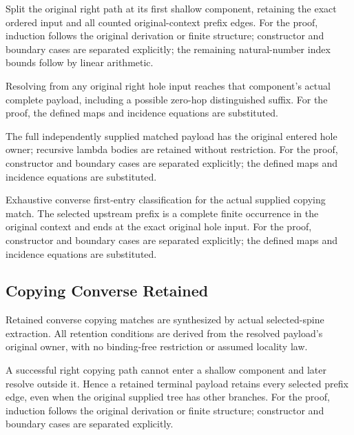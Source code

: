 Split the original right path at its first shallow component, retaining the exact ordered input and all counted original-context prefix edges.
For the proof, induction follows the original derivation or finite structure; constructor and boundary cases are separated explicitly; the remaining natural-number index bounds follow by linear arithmetic.
\par{}

Resolving from any original right hole input reaches that component's actual complete payload, including a possible zero-hop distinguished suffix.
For the proof, the defined maps and incidence equations are substituted.
\par{}

The full independently supplied matched payload has the original entered hole owner; recursive lambda bodies are retained without restriction.
For the proof, constructor and boundary cases are separated explicitly; the defined maps and incidence equations are substituted.
\par{}

Exhaustive converse first-entry classification for the actual supplied copying match. The selected upstream prefix is a complete finite occurrence in the original context and ends at the exact original hole input.
For the proof, constructor and boundary cases are separated explicitly; the defined maps and incidence equations are substituted.
\par{}

\subsection{Copying Converse Retained}
Retained converse copying matches are synthesized by actual selected-spine extraction. All retention conditions are derived from the resolved payload's original owner, with no binding-free restriction or assumed locality law.

A successful right copying path cannot enter a shallow component and later resolve outside it. Hence a retained terminal payload retains every selected prefix edge, even when the original supplied tree has other branches.
For the proof, induction follows the original derivation or finite structure; constructor and boundary cases are separated explicitly.
\par{}

